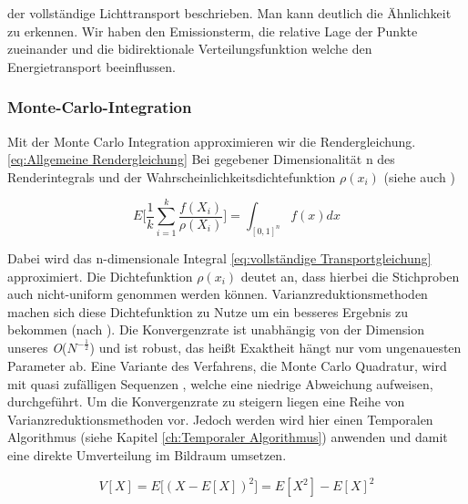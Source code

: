 der vollständige Lichttransport beschrieben. Man kann deutlich die Ähnlichkeit
zu  erkennen. Wir haben den Emissionsterm, die relative Lage der 
Punkte zueinander und die bidirektionale Verteilungsfunktion welche den Energietransport
beeinflussen.


\subsubsection{Monte-Carlo-Integration}
Mit der Monte Carlo Integration approximieren wir die Rendergleichung.\ref{eq:Allgemeine Rendergleichung} 
Bei gegebener Dimensionalität n des Renderintegrals und der 
Wahrscheinlichkeitsdichtefunktion $\rho(x_i)$
(siehe auch \cite{KK02})

\begin{tcolorbox}[rightrule=3mm, rounded corners=east]
    \begin{equation}\label{eq:Monte-Carlo}
        E\biggl[\frac{1}{k}\sum_{i=1}^{k}\frac{f(X_{i})}{\rho(X_{i})}\biggl] = \int_{[0,1]^{n}}f(x)dx
    \end{equation}
\end{tcolorbox}

Dabei wird das n-dimensionale Integral \ref{eq:vollständige Transportgleichung} approximiert. Die Dichtefunktion $\rho(x_i)$ 
deutet an, dass hierbei die Stichproben auch nicht-uniform genommen werden können. 
Varianzreduktionsmethoden machen sich diese Dichtefunktion zu Nutze um 
ein besseres Ergebnis zu bekommen (nach \cite{caflisch_1998}).
Die Konvergenzrate ist unabhängig von der Dimension unseres 
\textit{O}($N^{-\frac{1}{2}}$) und ist robust, das heißt Exaktheit hängt nur vom ungenauesten Parameter ab.
Eine Variante des Verfahrens, die Monte Carlo Quadratur, wird mit quasi zufälligen Sequenzen , 
welche eine niedrige Abweichung aufweisen, durchgeführt.
Um die Konvergenzrate zu steigern liegen eine Reihe von Varianzreduktionsmethoden vor. Jedoch werden wird hier 
einen Temporalen Algorithmus (siehe Kapitel \ref{ch:Temporaler Algorithmus}) anwenden und damit eine direkte Umverteilung im Bildraum 
umsetzen.
\begin{tcolorbox}[rightrule=3mm, rounded corners=east]
    \begin{equation}\label{eq:Monte-Carlo-Varianz}
        V[X] = E\biggl[(X-E[X])^{2}\biggl] = E[X^{2}]
        - E[X]^{2}
    \end{equation}
\end{tcolorbox}

